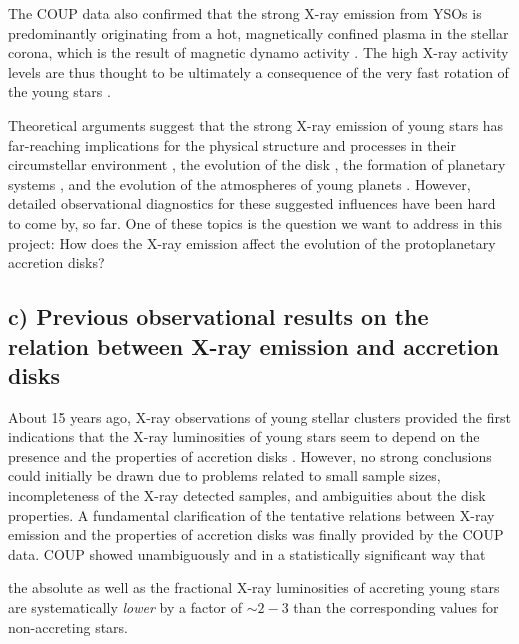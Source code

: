 \documentclass[10pt,fleqn,twoside]{article}
\begin{document}
The COUP data also confirmed 
that the strong X-ray emission from YSOs  is predominantly originating from
 a hot, magnetically confined plasma in the stellar corona, which is the result of magnetic
dynamo activity \citep{Preibisch_coup_orig}. 
The high X-ray activity levels are thus thought to be ultimately a consequence of
the very fast rotation of the young stars \citep[e.g.,][]{AP12}.

Theoretical arguments suggest that 
the strong X-ray emission of young stars  has far-reaching implications
for the physical structure and processes in their circumstellar environment 
\citep[e.g.,][]{Glassgold05,Wolk05,EG13}, 
the evolution of the disk \citep[e.g.,][]{Ercolano14}, the
formation of planetary systems \citep[e.g.][]{ER15}, and the evolution of 
the atmospheres of young planets \citep[e.g.,][]{Johnstone15}.
However, detailed observational diagnostics for these suggested influences
 have been hard to come by, so far.
One of these topics is the
question we want to address in this project: How does the X-ray emission
affect the evolution of the protoplanetary accretion disks?




\subsection*{c) Previous observational results on the relation between 
X-ray emission and accretion disks}

About 15 years ago, 
X-ray observations of young stellar clusters provided the first indications that
the X-ray luminosities of young stars seem to depend on the presence
and the properties of accretion disks \citep[e.g.][]{Stelzer01}.
However, no strong conclusions
could initially be drawn due to problems related to small sample sizes, incompleteness of the
 X-ray detected samples, and ambiguities about the disk properties.
%
A fundamental clarification of the tentative relations between X-ray emission and
the properties of accretion disks was finally provided by the COUP data.
COUP showed unambiguously
and in a statistically significant way
that 
\begin{highlight}
the  absolute as well as the fractional X-ray luminosities
of accreting young stars are systematically {\em lower} by a factor of
 $\sim 2-3$ than the corresponding values for  non-accreting stars.
\end{highlight}
%
\end{document}
